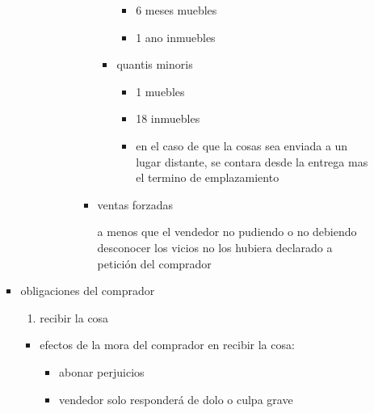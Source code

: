 \documentclass[]{article}
\providecommand{\tightlist}{%
  \setlength{\itemsep}{0pt}\setlength{\parskip}{0pt}}
\begin{document}
\begin{itemize}
\begin{itemize}
\begin{itemize}
\begin{itemize}
\begin{itemize}
\begin{itemize}
\begin{itemize}
\begin{itemize}
                \begin{itemize}
                \tightlist
                \item
                  6 meses muebles
                \item
                  1 ano inmuebles
                \end{itemize}
              \item
                quantis minoris

                \begin{itemize}
                \tightlist
                \item
                  1 muebles
                \item
                  18 inmuebles
                \item
                  en el caso de que la cosas sea enviada a un lugar
                  distante, se contara desde la entrega mas el termino
                  de emplazamiento
                \end{itemize}
              \end{itemize}
            \item
              ventas forzadas

              a menos que el vendedor no pudiendo o no debiendo
              desconocer los vicios no los hubiera declarado a petición
              del comprador
            \end{itemize}
          \end{itemize}
        \end{itemize}
      \end{itemize}
    \item
      obligaciones del comprador

      \begin{enumerate}
      \def\labelenumi{\arabic{enumi}.}
      \tightlist
      \item
        recibir la cosa
      \end{enumerate}

      \begin{itemize}
      \tightlist
      \item
        efectos de la mora del comprador en recibir la cosa:

        \begin{itemize}
        \tightlist
        \item
          abonar perjuicios
        \item
          vendedor solo responderá de dolo o culpa grave
        \end{itemize}
      \end{itemize}


\end{itemize}
\end{itemize}
\end{itemize}
\end{document}
